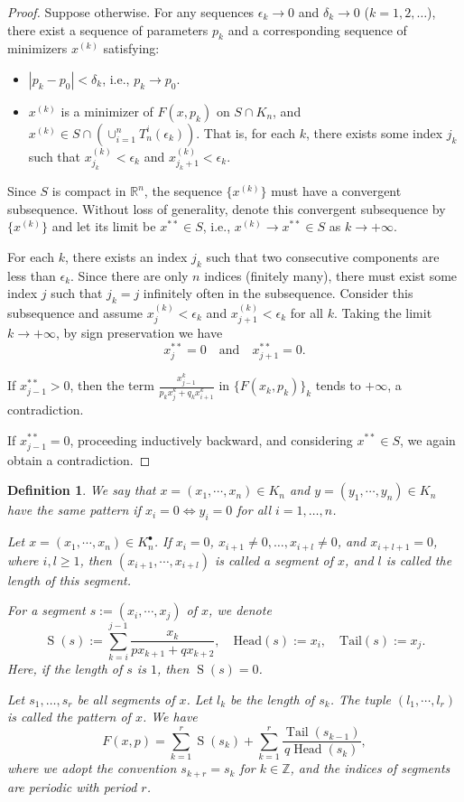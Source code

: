 \documentclass[a4paper,fleqn,numbers]{cas-sc}
\newtheorem{definition}[theorem]{Definition}
\DeclareMathOperator{\Head}{Head}
\DeclareMathOperator{\Tail}{Tail}
\DeclareMathOperator{\Sop}{S}
\begin{document}
	\begin{proof}
		Suppose otherwise. For any sequences $\epsilon_k \to 0$ and $\delta_k \to 0$ ($k =1,2,\ldots$), there exist a sequence of parameters $p_k$ and a corresponding sequence of minimizers $x^{(k)}$ satisfying:
		\begin{itemize}
			\item $|p_k - p_0| < \delta_k$, i.e., $p_k \to p_0$.
			\item $x^{(k)}$ is a minimizer of $F(x, p_k)$ on $S \cap K_n$, and $x^{(k)} \in S\cap(\cup_{i=1}^n T_n^i(\epsilon_k))$. 
			That is, for each $k$, there exists some index $j_k$ such that $x_{j_k}^{(k)} < \epsilon_k$ and $x_{j_k+1}^{(k)} < \epsilon_k$.
		\end{itemize}
		Since $S$ is compact in $\mathbb{R}^n$, the sequence $\{x^{(k)}\}$ must have a convergent subsequence. Without loss of generality, denote this convergent subsequence by $\{x^{(k)}\}$ and let its limit be $x^{**} \in S$, i.e., $x^{(k)} \to x^{**}\in S$ as $k \to +\infty$.
		
		For each $k$, there exists an index $j_k$ such that two consecutive components are less than $\epsilon_k$. Since there are only $n$ indices (finitely many), there must exist some index $j$ such that $j_k = j$ infinitely often in the subsequence. Consider this subsequence and assume $x_j^{(k)} < \epsilon_k$ and $x_{j+1}^{(k)} < \epsilon_k$ for all $k$. Taking the limit $k \to +\infty$, by sign preservation we have
		\[
		x_j^{**} = 0 \quad \text{and} \quad x_{j+1}^{**} = 0.
		\]
		
		If $x_{j-1}^{**}> 0$, then the term $\frac{x_{j-1}^k}{p_k x_j^k +q_k x_{i+1}^k}$ in $\{F(x_k,p_k)\}_k$ tends to $+\infty$, a contradiction.
		
		If $x_{j-1}^{**}=0$, proceeding inductively backward, and considering $x^{**}\in S$, we again obtain a contradiction.
	\end{proof}
	
	\begin{definition}
		We say that $x=(x_1, \cdots, x_n) \in K_n$ and $y=(y_1, \cdots, y_n) \in K_n$ have the same pattern if $x_i=0 \Leftrightarrow y_i=0$ for all $i=1, \ldots, n$.
		
		Let $x=(x_1, \cdots, x_n) \in {K}_n^{\bullet}$. If $x_{i} = 0$, $x_{i+1}\neq 0, \ldots, x_{i+l}\neq0$, and $x_{i+l+1} = 0$, where $i,l \geq 1$, then $(x_{i+1}, \cdots, x_{i+l})$ is called a segment of $x$, and $l$ is called the length of this segment.
		
		For a segment $s:=(x_i, \cdots, x_j)$ of $x$, we denote
		\[
		\Sop(s) := \sum_{k=i}^{j-1} \frac{x_k}{p x_{k+1}+q x_{k+2}}, \quad \text{Head}(s) := x_i, \quad \text{Tail}(s) := x_j.
		\]
		Here, if the length of $s$ is $1$, then $\Sop(s)=0$.
		
		Let $s_1, \ldots, s_r$ be all segments of $x$. Let $l_k$ be the length of $s_k$. The tuple $(l_1, \cdots, l_r)$ is called the pattern of $x$. We have
		\[
		F(x,p) = \sum_{k=1}^r \Sop(s_k) + \sum_{k=1}^r \frac{\Tail(s_{k-1})}{q\Head(s_k)},
		\]
		where we adopt the convention $s_{k+r}=s_k$ for $k \in \mathbb{Z}$, and the indices of segments are periodic with period $r$.
	\end{definition}
	
\end{document}
